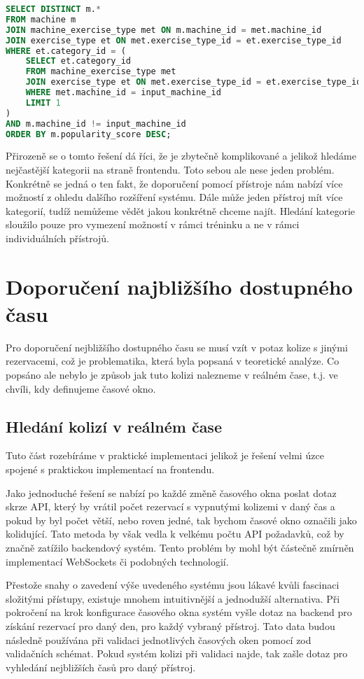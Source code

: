 \begin{lstlisting}[language=SQL]
SELECT DISTINCT m.*
FROM machine m
JOIN machine_exercise_type met ON m.machine_id = met.machine_id
JOIN exercise_type et ON met.exercise_type_id = et.exercise_type_id
WHERE et.category_id = (
    SELECT et.category_id
    FROM machine_exercise_type met
    JOIN exercise_type et ON met.exercise_type_id = et.exercise_type_id
    WHERE met.machine_id = input_machine_id
    LIMIT 1
)
AND m.machine_id != input_machine_id
ORDER BY m.popularity_score DESC;
\end{lstlisting}
Přirozeně se o tomto řešení dá říci, že je zbytečně komplikované a jelikož hledáme nejčastější kategorii na straně frontendu. Toto sebou ale nese jeden problém. Konkrétně se jedná o ten fakt, že doporučení pomocí přístroje nám nabízí více možností z ohledu dalšího rozšíření systému. Dále může jeden přístroj mít více kategorií, tudíž nemůžeme vědět jakou konkrétně chceme najít. Hledání kategorie sloužilo pouze pro vymezení možností v rámci tréninku a ne v rámci individuálních přístrojů.

\section{Doporučení najbližšího dostupného času}

Pro doporučení nejbližšího dostupného času se musí vzít v potaz kolize s jinými rezervacemi, což je problematika, která byla popsaná v teoretické analýze. Co popsáno ale nebylo je způsob jak tuto kolizi nalezneme v reálném čase, t.j. ve chvíli, kdy definujeme časové okno.

\subsection{Hledání kolizí v reálném čase}
Tuto část rozebíráme v praktické implementaci jelikož je řešení velmi úzce spojené s praktickou implementací na frontendu. 

Jako jednoduché řešení se nabízí po každé změně časového okna poslat dotaz skrze API, který by vrátil počet rezervací s vypnutými kolizemi v daný čas a pokud by byl počet větší, nebo roven jedné, tak bychom časové okno označili jako kolidující. Tato metoda by však vedla k velkému počtu API požadavků, což by značně zatížilo backendový systém. Tento problém by mohl být částečně zmírněn implementací WebSockets či podobných technologií.

Přestože snahy o zavedení výše uvedeného systému jsou lákavé kvůli fascinaci složitými přístupy, existuje mnohem intuitivnější a jednodužší alternativa. Při pokročení na krok konfigurace časového okna systém vyšle dotaz na backend pro získání rezervací pro daný den, pro každý vybraný přístroj. Tato data budou následně používána při validaci jednotlivých časových oken pomocí zod validačních schémat. Pokud systém kolizi při validaci najde, tak zašle dotaz pro vyhledání nejbližších časů pro daný přístroj.


